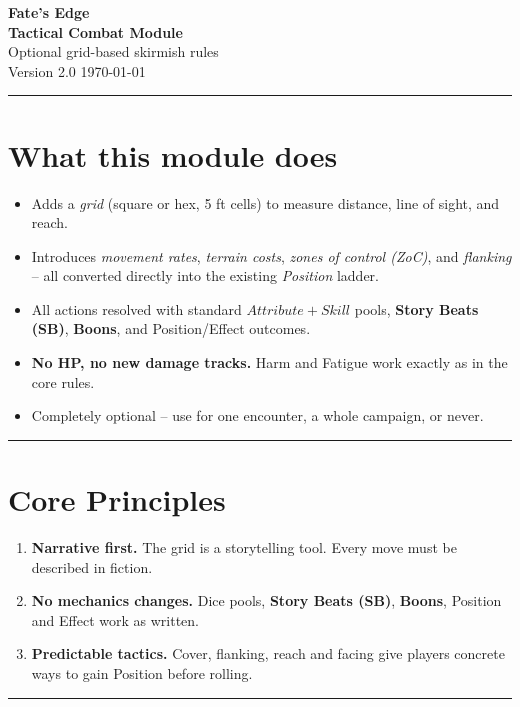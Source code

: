 \documentclass[12pt]{article}
\newcommand{\term}[1]{\textit{#1}}
\newcommand{\dice}[2]{\ensuremath{\displaystyle #1\!\!+\!\!#2}}   %
\newcommand{\boon}{\textbf{Boons}}
\newcommand{\storybeats}{\textbf{Story Beats (SB)}}   %
\begin{document}

\thispagestyle{empty}
\begin{center}
    {\LARGE\bfseries Fate's Edge}\\[2mm]
    {\Large\bfseries Tactical Combat Module }\\[4mm]
    {\large Optional grid-based skirmish rules}\\[2mm]
    {\normalsize Version 2.0 \quad \today}
\end{center}
\vspace{1cm}
\hrule
\vspace{0.5cm}

\section*{What this module does}
\begin{itemize}[leftmargin=*,noitemsep]
    \item Adds a \term{grid} (square or hex, 5 ft cells) to measure distance, line of sight, and reach.
    \item Introduces \term{movement rates}, \term{terrain costs}, \term{zones of control (ZoC)}, and \term{flanking} -- all converted directly into the existing \term{Position} ladder.
    \item All actions resolved with standard \dice{Attribute}{Skill} pools, \storybeats, \boon, and Position/Effect outcomes.
    \item \textbf{No HP, no new damage tracks.} Harm and Fatigue work exactly as in the core rules.
    \item Completely optional -- use for one encounter, a whole campaign, or never.
\end{itemize}
\vspace{0.2cm}
\hrule
\vspace{0.6cm}


\section{Core Principles}
\begin{enumerate}[label=\arabic\textit{., leftmargin=}]
    \item \textbf{Narrative first.} The grid is a storytelling tool. Every move must be described in fiction.
    \item \textbf{No mechanics changes.} Dice pools, \storybeats, \boon, Position and Effect work as written.
    \item \textbf{Predictable tactics.} Cover, flanking, reach and facing give players concrete ways to gain Position before rolling.
\end{enumerate}
\vspace{0.2cm}
\hrule
\vspace{0.6cm}
\end{document}
